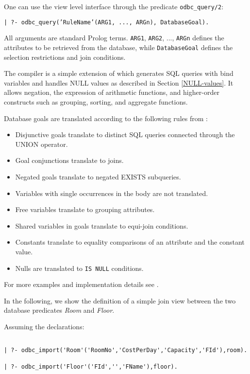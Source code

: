 One can use the view level interface through the predicate {\tt odbc\_query/2}:  
\begin{center}
{\tt | ?- odbc\_query('RuleName'(ARG1, ..., ARGn), DatabaseGoal).}
\end{center}
All arguments are standard Prolog terms.  {\tt ARG1}, {\tt ARG2}, ...,
{\tt ARGn} defines the attributes to be retrieved from the database,
while {\tt DatabaseGoal} defines the selection restrictions and join
conditions.

The compiler is a simple extension of \cite{Drax92} which generates SQL
queries with bind variables and handles NULL values as described in
Section \ref{NULL-values}.  It allows negation, the expression
of arithmetic functions, and higher-order constructs such as grouping,
sorting, and aggregate functions.

Database goals are translated according to the following rules
from \cite{Drax92}:
\begin{itemize}
\item Disjunctive goals translate to distinct SQL queries
        connected through the UNION operator.
\item Goal conjunctions translate to joins.
\item Negated goals translate to negated EXISTS subqueries.
\item Variables with single occurrences in the body are not
          translated.
\item Free variables translate to grouping attributes.
\item Shared variables in goals translate to equi-join conditions.
\item Constants translate to equality comparisons of an attribute and
          the constant value.
\item Nulls are translated to {\tt IS NULL} conditions.
\end{itemize}
For more examples and implementation details see \cite{Drax92}.
 
In the following, we show the definition of a simple join view between the 
two database predicates {\it Room} and {\it Floor}.

Assuming the declarations:
\begin{verbatim}

| ?- odbc_import('Room'('RoomNo','CostPerDay','Capacity','FId'),room).

| ?- odbc_import('Floor'('FId','','FName'),floor).
\end{verbatim}

